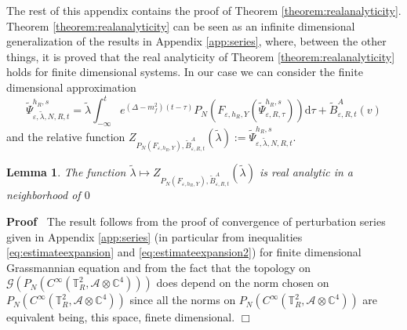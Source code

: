 \documentclass{article}
\newcommand{\assign}{:=}
\newcommand{\mathd}{\mathrm{d}}
\newenvironment{proof}{\noindent\textbf{Proof\ }}{\hspace*{\fill}$\Box$\medskip}
\newtheorem{lemma}[theorem]{Lemma}
\begin{document}
The rest of this appendix contains the proof of Theorem
\ref{theorem:realanalyticity}. Theorem \ref{theorem:realanalyticity} can be
seen as an infinite dimensional generalization of the results in Appendix
\ref{app:series}, where, between the other things, it is proved that the real
analyticity of Theorem \ref{theorem:realanalyticity} holds for finite
dimensional systems. In our case we can consider the finite dimensional
approximation
\begin{equation}
  \tilde{\Psi}_{\varepsilon, \tilde{\lambda}, N, R, t}^{h_R, s} =
  \tilde{\lambda} \int_{- \infty}^t e^{(\Delta - m_f^2) (t - \tau)} P_N
  (F_{\varepsilon, h_R, Y} (\tilde{\Psi}_{\varepsilon, R, \tau}^{h_R, s}))
  \mathd \tau + \tilde{B}^A_{\varepsilon, R, t} (v) \label{eq:real2}
\end{equation}
and the relative function $Z_{P_N (F_{\varepsilon, h_R, Y}),
\tilde{B}^A_{\varepsilon, R, t}} (\tilde{\lambda}) \assign
\tilde{\Psi}_{\varepsilon, \tilde{\lambda}, N, R, t}^{h_R, s}$.

\begin{lemma}
  \label{lemma:realanalytic}The function $\tilde{\lambda} \mapsto Z_{P_N
  (F_{\varepsilon, h_R, Y}), \tilde{B}^A_{\varepsilon, R, t}}
  (\tilde{\lambda})$ is real analytic in a neighborhood of $0$
\end{lemma}

\begin{proof}
  The result follows from the proof of convergence of perturbation series
  given in Appendix \ref{app:series} (in particular from inequalities
  {\eqref{eq:estimateexpansion}} and {\eqref{eq:estimateexpansion2}}) for
  finite dimensional Grassmannian equation and from the fact that the topology
  on $\mathcal{G} (P_N (C^{\infty} (\mathbb{T}^2_R, \mathcal{A} \otimes
  \mathbb{C}^4)))$ does depend on the norm chosen on $P_N (C^{\infty}
  (\mathbb{T}^2_R, \mathcal{A} \otimes \mathbb{C}^4))$ since all the norms on
  $P_N (C^{\infty} (\mathbb{T}^2_R, \mathcal{A} \otimes \mathbb{C}^4))$ are
  equivalent being, this space, finete dimensional. 
\end{proof}
\end{document}
